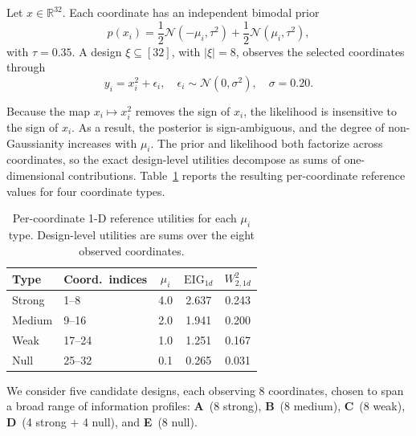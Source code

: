 \documentclass[twoside,11pt]{article}
\newcommand{\R}{\mathbb{R}}
\begin{document}
Let $x \in \R^{32}$. Each coordinate has an independent bimodal prior
\[
p(x_i) = \frac{1}{2}\mathcal{N}(-\mu_i,\tau^2)
       + \frac{1}{2}\mathcal{N}(\mu_i,\tau^2),
\]
with $\tau = 0.35$. A design $\xi \subseteq [32]$, with $|\xi|=8$, observes the selected coordinates through
\[
y_i = x_i^2 + \epsilon_i,
\quad \epsilon_i\sim \mathcal{N}(0,\sigma^2), \quad
\sigma = 0.20.
\]

Because the map $x_i \mapsto x_i^2$ removes the sign of $x_i$, the likelihood is insensitive to the sign of $x_i$. As a result, the posterior is sign-ambiguous, and the degree of non-Gaussianity increases with $\mu_i$. The prior and likelihood both factorize across coordinates, so the exact design-level utilities decompose as sums of one-dimensional contributions. Table~\ref{tab:coord-types} reports the resulting per-coordinate reference values for four coordinate types.

\begin{table}[h]
  \centering
  \caption{%
    Per-coordinate 1-D reference utilities for each $\mu_i$ type.
    Design-level utilities are sums over the eight observed coordinates.
  }
  \label{tab:coord-types}
  \smallskip
  \begin{tabular}{llccc}
    \toprule
    Type   & Coord.\ indices & $\mu_i$ &
    $\mathrm{EIG}_{1d}$ & $W_{2,1d}^2$ \\
    \midrule
    Strong & 1--8   & 4.0 & 2.637 & 0.243 \\
    Medium & 9--16  & 2.0 & 1.941 & 0.200 \\
    Weak   & 17--24 & 1.0 & 1.251 & 0.167 \\
    Null   & 25--32 & 0.1 & 0.265 & 0.031 \\
    \bottomrule
  \end{tabular}
\end{table}
We consider five candidate designs, each observing $8$ coordinates, chosen to span a broad range of information profiles:
\textbf{A}~(8 strong), \textbf{B}~(8 medium), \textbf{C}~(8 weak), \textbf{D}~(4 strong $+$ 4 null), and \textbf{E}~(8 null).
\end{document}
